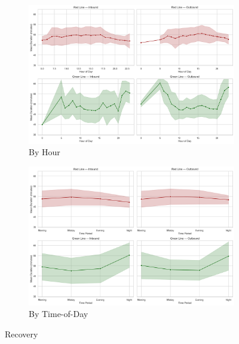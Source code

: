 \begin{figure}[H]
  \centering
  \begin{subfigure}[t]{0.49\textwidth}
    \centering
    \includegraphics[width=\textwidth]{figures/appendix_figures/journey_duration/duration_hourly_combined_recovery.png}
    \caption*{By Hour}
  \end{subfigure}
  \hfill
  \begin{subfigure}[t]{0.49\textwidth}
    \centering
    \includegraphics[width=\textwidth]{figures/appendix_figures/journey_duration/duration_period_combined_recovery.png}
    \caption*{By Time-of-Day}
  \end{subfigure}
  \caption{Recovery}
\end{figure}

